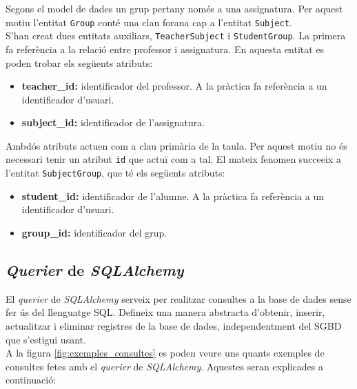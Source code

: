    	Segons el model de dades un grup pertany només a una assignatura. Per aquest motiu l'entitat \texttt{Group} conté una clau forana cap a l'entitat \texttt{Subject}.\\
   	
   	S'han creat dues entitats auxiliars, \texttt{TeacherSubject} i \texttt{StudentGroup}. La primera fa referència a la relació entre professor i assignatura. En aquesta entitat es poden trobar els següents atributs:
   	
   	\begin{itemize}
   		\item \textbf{teacher\_id:} identificador del professor. A la pràctica fa referència a un identificador d'usuari.
   		\item \textbf{subject\_id:} identificador de l'assignatura.
   	\end{itemize}
   	
   	Ambdós atributs actuen com a clau primària de la taula. Per aquest motiu no és necessari tenir un atribut \texttt{id} que actuï com a tal. El mateix fenomen succeeix a l'entitat \texttt{SubjectGroup}, que té els següents atributs:
   	
   	\begin{itemize}
   		\item \textbf{student\_id:} identificador de l'alumne. A la pràctica fa referència a un identificador d'usuari.
   		\item \textbf{group\_id:} identificador del grup.
   	\end{itemize}
   	   
   \subsection{\emph{Querier} de \emph{SQLAlchemy}}
   
   El \emph{querier} de \emph{SQLAlchemy} serveix per realitzar consultes a la base de dades sense fer ús del llenguatge \ac{SQL}. Defineix una manera abstracta d'obtenir, inserir, actualitzar i eliminar registres de la base de dades, independentment del \ac{SGBD} que s'estigui usant. \\
  
	A la figura \ref{fig:exemples_consultes} es poden veure uns quants exemples de consultes fetes amb el \emph{querier} de \emph{SQLAlchemy}. Aquestes seran explicades a continuació:


